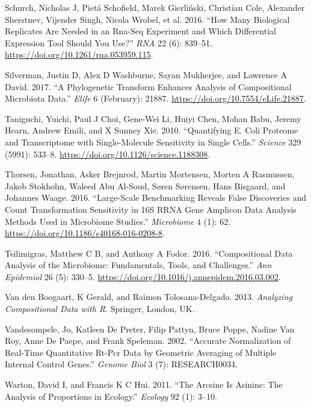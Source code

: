 \documentclass[onecolumn]{article}
\begin{document}
\leavevmode\hypertarget{ref-Schurch:2016aa}{}%
Schurch, Nicholas J, Pietá Schofield, Marek Gierliński, Christian Cole, Alexander Sherstnev, Vijender Singh, Nicola Wrobel, et al. 2016. ``How Many Biological Replicates Are Needed in an Rna-Seq Experiment and Which Differential Expression Tool Should You Use?'' \emph{RNA} 22 (6): 839--51. \url{https://doi.org/10.1261/rna.053959.115}.

\leavevmode\hypertarget{ref-Silverman:2017aa}{}%
Silverman, Justin D, Alex D Washburne, Sayan Mukherjee, and Lawrence A David. 2017. ``A Phylogenetic Transform Enhances Analysis of Compositional Microbiota Data.'' \emph{Elife} 6 (February): 21887. \url{https://doi.org/10.7554/eLife.21887}.

\leavevmode\hypertarget{ref-Taniguchi:2010aa}{}%
Taniguchi, Yuichi, Paul J Choi, Gene-Wei Li, Huiyi Chen, Mohan Babu, Jeremy Hearn, Andrew Emili, and X Sunney Xie. 2010. ``Quantifying E. Coli Proteome and Transcriptome with Single-Molecule Sensitivity in Single Cells.'' \emph{Science} 329 (5991): 533--8. \url{https://doi.org/10.1126/science.1188308}.

\leavevmode\hypertarget{ref-Thorsen:2016aa}{}%
Thorsen, Jonathan, Asker Brejnrod, Martin Mortensen, Morten A Rasmussen, Jakob Stokholm, Waleed Abu Al-Soud, Søren Sørensen, Hans Bisgaard, and Johannes Waage. 2016. ``Large-Scale Benchmarking Reveals False Discoveries and Count Transformation Sensitivity in 16S RRNA Gene Amplicon Data Analysis Methods Used in Microbiome Studies.'' \emph{Microbiome} 4 (1): 62. \url{https://doi.org/10.1186/s40168-016-0208-8}.

\leavevmode\hypertarget{ref-Tsilimigras:2016aa}{}%
Tsilimigras, Matthew C B, and Anthony A Fodor. 2016. ``Compositional Data Analysis of the Microbiome: Fundamentals, Tools, and Challenges.'' \emph{Ann Epidemiol} 26 (5): 330--5. \url{https://doi.org/10.1016/j.annepidem.2016.03.002}.

\leavevmode\hypertarget{ref-van2013}{}%
Van den Boogaart, K Gerald, and Raimon Tolosana-Delgado. 2013. \emph{Analyzing Compositional Data with R}. Springer, London, UK.

\leavevmode\hypertarget{ref-Vandesompele:2002aa}{}%
Vandesompele, Jo, Katleen De Preter, Filip Pattyn, Bruce Poppe, Nadine Van Roy, Anne De Paepe, and Frank Speleman. 2002. ``Accurate Normalization of Real-Time Quantitative Rt-Pcr Data by Geometric Averaging of Multiple Internal Control Genes.'' \emph{Genome Biol} 3 (7): RESEARCH0034.

\leavevmode\hypertarget{ref-Warton:2011aa}{}%
Warton, David I, and Francis K C Hui. 2011. ``The Arcsine Is Asinine: The Analysis of Proportions in Ecology.'' \emph{Ecology} 92 (1): 3--10.
\end{document}

